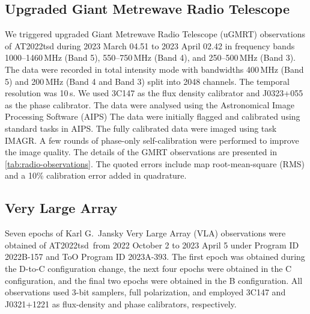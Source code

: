 \documentclass{nature_plusfigure}
\newcommand{\at}{AT2022tsd}
\begin{document}
\begin{methods}


\subsection{Upgraded Giant Metrewave Radio Telescope}
\label{sec:GMRT}

We triggered upgraded Giant Metrewave Radio Telescope (uGMRT) observations of AT2022tsd
during 2023 March 04.51 to 2023 April 02.42 in frequency bands 1000--1460\,MHz
(Band 5), 550--750\,MHz (Band 4), and 250--500\,MHz (Band 3). The data were recorded
in total intensity mode with bandwidths 400\,MHz (Band 5) and 200\,MHz (Band 4 and Band 3)
split into 2048 channels. The temporal resolution was 10\,s. We used 3C147 as the flux density
calibrator and J0323+055 as the phase calibrator.
The data were analysed\cite{Nayana2017} using the Astronomical Image Processing Software (AIPS\cite{Greisen2003})
The data were initially flagged and calibrated using standard tasks in AIPS. The fully calibrated data were imaged
using task IMAGR. A few rounds of phase-only self-calibration were performed to improve the
image quality. The details of the GMRT observations are presented in \ref{tab:radio-observations}. The quoted errors
include map root-mean-square (RMS) and a 10\% calibration error added in quadrature.

\subsection{Very Large Array}
\label{sec:VLA}

Seven epochs of Karl G.\ Jansky Very Large Array (VLA\cite{Perley2011}) observations were obtained of \at\ from 2022 October 2 to 2023 April 5 under Program ID 2022B-157 and ToO Program ID 2023A-393.
The first epoch was obtained during the D-to-C configuration change, the next four epochs were obtained in the C configuration, and the final two epochs were obtained in the B configuration.
All observations used 3-bit samplers, full polarization, and employed 3C147 and J0321+1221 as flux-density and phase calibrators, respectively.


\end{methods}
\end{document}
